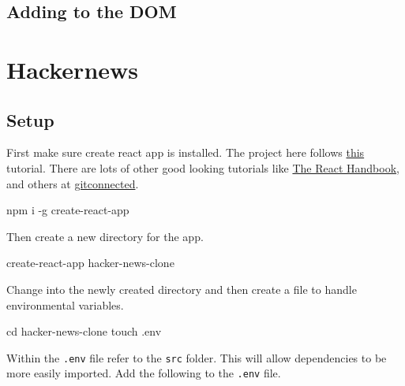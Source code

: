\documentclass[]{book}
\newenvironment{Shaded}{\begin{snugshade}}{\end{snugshade}}
\newcommand{\FunctionTok}[1]{\textcolor[rgb]{0.00,0.00,0.00}{#1}}
\newcommand{\BuiltInTok}[1]{#1}
\newcommand{\ExtensionTok}[1]{#1}
\newcommand{\NormalTok}[1]{#1}
\begin{document}
\section{Adding to the DOM}\label{adding-to-the-dom}

\chapter{Hackernews}\label{hackernews}

\section{Setup}\label{setup-1}

First make sure create react app is installed. The project here follows
\href{https://www.youtube.com/watch?v=oGB_VPrld0U\&list=PLTTC1K14KAxHj6AftnRUD28SQaoVauvl3}{this}
tutorial. There are lots of other good looking tutorials like
\href{https://www.freecodecamp.org/news/the-react-handbook-b71c27b0a795/}{The
React Handbook}, and others at
\href{https://gitconnected.com/learn/react}{gitconnected}.

\begin{Shaded}
\begin{Highlighting}[]
\ExtensionTok{npm}\NormalTok{ i -g create-react-app}
\end{Highlighting}
\end{Shaded}

Then create a new directory for the app.

\begin{Shaded}
\begin{Highlighting}[]
\ExtensionTok{create-react-app}\NormalTok{ hacker-news-clone}
\end{Highlighting}
\end{Shaded}

Change into the newly created directory and then create a file to handle
environmental variables.

\begin{Shaded}
\begin{Highlighting}[]
\BuiltInTok{cd}\NormalTok{ hacker-news-clone}
\FunctionTok{touch}\NormalTok{ .env}
\end{Highlighting}
\end{Shaded}

Within the \texttt{.env} file refer to the \texttt{src} folder. This
will allow dependencies to be more easily imported. Add the following to
the \texttt{.env} file.
\end{document}

